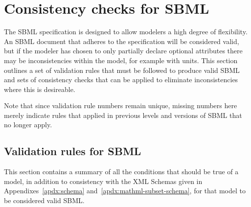 
\newcommand{\sbmlrule}[1]{\item[#1.]}

\section{Consistency checks for SBML}
\label{apdx:validation-rules}

The SBML specification is designed to allow modelers a high degree
of flexibility.  An SBML document that adheres to the specification 
will be considered valid, but if the modeler has chosen to only
partially declare optional attributes there may be inconsistencies
within the model, for example with units.  This section outlines a 
set of validation rules that must be followed to produce valid SBML 
and sets of consistency checks that can be applied to eliminate  
inconsistencies where this is desireable.

Note that since validation rule numbers remain unique, missing numbers
here merely indicate rules that applied in previous levels and
versions of SBML that no longer apply.

\subsection{Validation rules for SBML}

This section contains a summary of all the conditions that should
be true of a model, in addition to consistency with the XML
Schemas given in Appendixes~\ref{apdx:schema}
and~\ref{apdx:mathml-subset-schema}, for that model to be considered
valid SBML.


